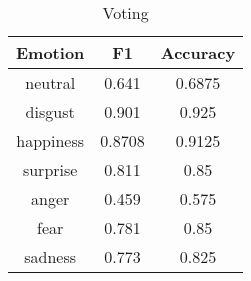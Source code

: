 \begin{table}[h]
\caption{Voting}
\label{table:voting}
\centering
    \begin{tabular}{|c|c|c|}
\hline
\textbf{Emotion} &  \textbf{F1} &  \textbf{Accuracy} \\ \hline \hline
neutral& 0.641& 0.6875 \\ \hline
disgust& 0.901 & 0.925 \\ \hline
happiness& 0.8708 & 0.9125 \\ \hline
surprise& 0.811& 0.85 \\ \hline
anger& 0.459& 0.575 \\ \hline
fear& 0.781& 0.85 \\ \hline
sadness& 0.773 & 0.825 \\ \hline
\end{tabular}
\end{table}
